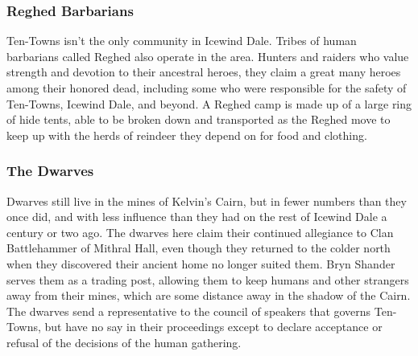 \documentclass[10pt,a4paper,twoside,twocolumn,openany,bg=print,nodeprecatedcode]{dndbook}
\begin{document}
\subsubsection{Reghed Barbarians}
Ten-Towns isn't the only community in Icewind Dale. Tribes of human barbarians called Reghed also operate in the area. Hunters and raiders who value strength and devotion to their ancestral heroes, they claim a great many heroes among their honored dead, including some who were responsible for the safety of Ten-Towns, Icewind Dale, and beyond. A Reghed camp is made up of a large ring of hide tents, able to be broken down and transported as the Reghed move to keep up with the herds of reindeer they depend on for food and clothing.
\subsubsection{The Dwarves}
Dwarves still live in the mines of Kelvin's Cairn, but in fewer numbers than they once did, and with less influence than they had on the rest of Icewind Dale a century or two ago. The dwarves here claim their continued allegiance to Clan Battlehammer of Mithral Hall, even though they returned to the colder north when they discovered their ancient home no longer suited them. Bryn Shander serves them as a trading post, allowing them to keep humans and other strangers away from their mines, which are some distance away in the shadow of the Cairn. The dwarves send a representative to the council of speakers that governs Ten-Towns, but have no say in their proceedings except to declare acceptance or refusal of the decisions of the human gathering.
\end{document}
